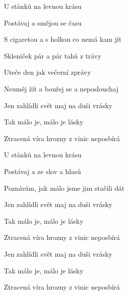 \begin{song}


\large


\Large

\bigskip

U stánků na levnou krásu \par
{}Postávaj a smějou se času \par
{}S cigaretou a s holkou co nemá kam jít \par

\bigskip

Skleniček pár a pár tahů z trávy \par
{}Uteče den jak večerní zprávy \par
{}Neuměj žít a bouřej se a neposlouchaj  \par

\bigskip

Jen zahlídli svět maj na duši vrásky \par
Tak málo je, málo je lásky \par
{}Ztracená víra hrozny z vinic neposbírá \par

\bigskip

U stánků na levnou krásu \par
{}Postávaj a ze slov a hlasů \par
{}Poznávám, jak málo jsme jim stačili dát  \par

\bigskip

Jen zahlídli svět maj na duši vrásky \par
Tak málo je, málo je lásky \par
{}Ztracená víra hrozny z vinic neposbírá  \par

\bigskip

Jen zahlídli svět maj na duši vrásky \par
Tak málo je, málo je lásky \par
{}Ztracená víra hrozny z vinic neposbírá \par

\end{song}
